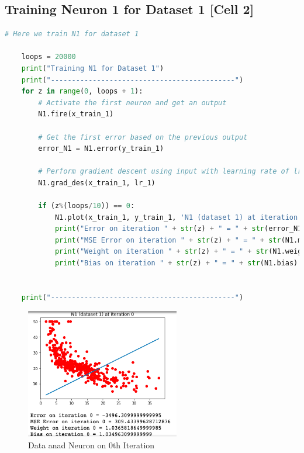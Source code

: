 \documentclass[a4paper, 12pt]{article}
\begin{document}
    \pagebreak

    \subsection{Training Neuron 1 for Dataset 1 [Cell 2]}

    \begin{lstlisting}[language=python, caption=Dataset 1 Training Code (Cell 2)]
    # Here we train N1 for dataset 1

    loops = 20000
    print("Training N1 for Dataset 1")
    print("--------------------------------------------")
    for z in range(0, loops + 1):
        # Activate the first neuron and get an output
        N1.fire(x_train_1)
        
        # Get the first error based on the previous output
        error_N1 = N1.error(y_train_1)
    
        # Perform gradient descent using input with learning rate of lr_1
        N1.grad_des(x_train_1, lr_1)
    
        if (z%(loops/10)) == 0:
            N1.plot(x_train_1, y_train_1, 'N1 (dataset 1) at iteration ' + str(z))
            print("Error on iteration " + str(z) + " = " + str(error_N1.sum()))
            print("MSE Error on iteration " + str(z) + " = " + str(N1.mse(y_train_1)))
            print("Weight on iteration " + str(z) + " = " + str(N1.weight))
            print("Bias on iteration " + str(z) + " = " + str(N1.bias) + '\n')
            
    
    print("--------------------------------------------")\end{lstlisting}

    \begin{figure}[h!]
        \centering
        \captionsetup{justification=centering}
        \centering
            \includegraphics[width=0.6\textwidth]{1.png}
            \caption{Data anad Neuron on 0th Iteration}
    \end{figure}
\end{document}
